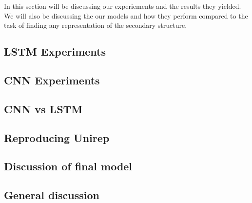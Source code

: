 In this section will be discussing our experiements and the results they yielded. We will also be discussing the our models and how they perform compared to the task of finding any representation of the secondary structure.

\subsection{LSTM Experiments}


\subsection{CNN Experiments}


\subsection{CNN vs LSTM}


\subsection{Reproducing Unirep}
\subsection{Discussion of final model}
\subsection{General discussion}
